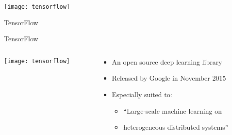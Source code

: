 
{
\begin{slide}{}
  \vspace{1.5cm}

  \texttt{[image: tensorflow]}

  \vspace{1cm}

  {
    \Huge
    \color{orange}
    TensorFlow
  }
\end{slide}
}

\addtocounter{framenumber}{-1}

\begin{slide}{TensorFlow}
\begin{columns}
  \begin{column}{0.5\textwidth}
    \hspace{1cm}\texttt{[image: tensorflow]}
  \end{column}
  \begin{column}{0.5\textwidth}
    \begin{itemize}
    \item<1-> An open source deep learning library
    \item<2-> Released by Google in November 2015
    \item<3-> Especially suited to:
      \begin{itemize}
        \item<3-> ``Large-scale machine learning on
        \item<3-> heterogeneous distributed systems''
      \end{itemize}
    \end{itemize}
  \end{column}
\end{columns}
\end{slide}

\graphicspath{{tensorflow-paper/presentation/figures/}}



% 

%

